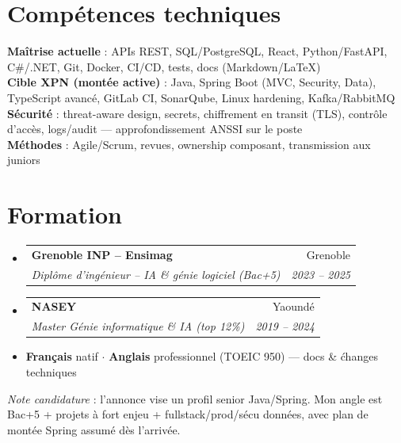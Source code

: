 \documentclass[a4paper,10.5pt]{article}
\makeatletter
\newcommand{\resumeSubheading}[4]{\vspace{3pt}\item\begin{tabular*}{0.97\textwidth}[t]{l@{\extracolsep{\fill}}r}\textbf{#1}&{#2}\\\textit{\small #3}&\textit{\small #4}\\\end{tabular*}\vspace{1pt}}
\newcommand{\resumeSubHeadingListStart}{\begin{itemize}[leftmargin=0.08in,label={}]}
\newcommand{\resumeSubHeadingListEnd}{\end{itemize}}
\makeatother
\begin{document}
\section{Comp\'etences techniques}
\begin{itemize}[leftmargin=0.08in,label={}]\small{\item{
\textbf{Ma\^itrise actuelle} : APIs REST, SQL/PostgreSQL, React, Python/FastAPI, C\#/.NET, Git, Docker, CI/CD, tests, docs (Markdown/LaTeX) \\
\textbf{Cible XPN (mont\'ee active)} : Java, Spring Boot (MVC, Security, Data), TypeScript avanc\'e, GitLab CI, SonarQube, Linux hardening, Kafka/RabbitMQ \\
\textbf{S\'ecurit\'e} : threat-aware design, secrets, chiffrement en transit (TLS), contr\^ole d'acc\`es, logs/audit --- approfondissement ANSSI sur le poste \\
\textbf{M\'ethodes} : Agile/Scrum, revues, ownership composant, transmission aux juniors
}}\end{itemize}

\section{Formation}
\resumeSubHeadingListStart
  \resumeSubheading{Grenoble INP -- Ensimag}{Grenoble}{Dipl\^ome d'ing\'enieur -- IA \& g\'enie logiciel (Bac+5)}{2023 -- 2025}
  \resumeSubheading{NASEY}{Yaound\'e}{Master G\'enie informatique \& IA (top 12\%)}{2019 -- 2024}
\resumeSubHeadingListEnd
\begin{itemize}[leftmargin=0.08in,label={}]\item \textbf{Fran\c{c}ais} natif $\cdot$ \textbf{Anglais} professionnel (TOEIC 950) --- docs \& \'changes techniques\end{itemize}

\vspace{4pt}
\small{\textit{Note candidature} : l'annonce vise un profil senior Java/Spring. Mon angle est Bac+5 + projets \`a fort enjeu + fullstack/prod/s\'ecu donn\'ees, avec plan de mont\'ee Spring assum\'e d\`es l'arriv\'ee.}
\end{document}
